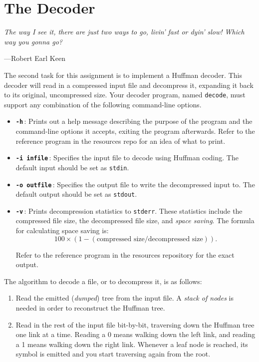 \section{The Decoder}
\textwidth
\epigraph{\emph{The way I see it, there are just two ways to go, livin' fast or dyin' slow! Which way you gonna go?}}{---Robert Earl Keen}

\noindent
The second task for this assignment is to implement a Huffman decoder.
This decoder will read in a compressed input file and decompress it,
expanding it back to its original, uncompressed size. Your decoder
program, named \texttt{decode}, must support any combination of the
following command-line options.

\begin{itemize}
  \item \textbf{\texttt{-h}}\,: Prints out a help message describing the purpose
    of the program and the command-line options it accepts, exiting the
    program afterwards. Refer to the reference program in the resources
    repo for an idea of what to print.

  \item \textbf{\texttt{-i infile}}\,: Specifies the input file to
    decode using Huffman coding. The default input should be set as
    \texttt{stdin}.

  \item \textbf{\texttt{-o outfile}}\,: Specifies the output file to
    write the decompressed input to. The default output should be set as
    \texttt{stdout}.

  \item \textbf{\texttt{-v}}\,: Prints decompression statistics to
    \texttt{stderr}. These statistics include the compressed file size,
    the decompressed file size, and \emph{space saving}. The formula for
    calculating space saving is:
    \[
      100 \times (1 - (\text{compressed size} / \text{decompressed
      size})).
    \]

    Refer to the reference program in the resources repository for the
    exact output.
\end{itemize}

\noindent The algorithm to decode a file, or to decompress it, is as follows:

\begin{enumerate}
  \item Read the emitted (\emph{dumped}) tree from the input file. A
    \emph{stack of nodes} is needed in order to reconstruct the Huffman
    tree.

  \item Read in the rest of the input file bit-by-bit, traversing down
    the Huffman tree one link at a time. Reading a 0 means walking down
    the left link, and reading a 1 means walking down the right link.
    Whenever a leaf node is reached, its symbol is emitted and you start
    traversing again from the root.
\end{enumerate}
